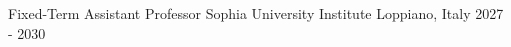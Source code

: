 

\begin{cvhonors}

  \cvhonor
    {Fixed-Term Assistant Professor} %
    {Sophia University Institute} %
    {Loppiano, Italy} %
    {2027 - 2030} %

\end{cvhonors}
